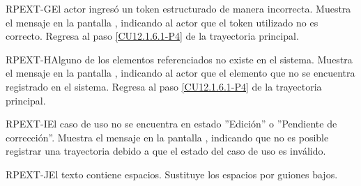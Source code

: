 	\begin{UCtrayectoriaA}{RPEXT-G}{El actor ingresó un token estructurado de manera incorrecta.}
		\UCpaso[\UCsist] Muestra el mensaje  en la pantalla , indicando al actor que el token utilizado no es correcto.
		\UCpaso Regresa al paso \ref{CU12.1.6.1-P4} de la trayectoria principal.
	\end{UCtrayectoriaA}
	
	\begin{UCtrayectoriaA}{RPEXT-H}{Alguno de los elementos referenciados no existe en el sistema.}
		\UCpaso[\UCsist] Muestra el mensaje  en la pantalla , indicando al actor que el elemento que no se encuentra registrado en el sistema.
		\UCpaso Regresa al paso \ref{CU12.1.6.1-P4} de la trayectoria principal.
	\end{UCtrayectoriaA}

	\begin{UCtrayectoriaA}{RPEXT-I}{El caso de uso no se encuentra en estado ''Edición'' o ''Pendiente de corrección''.}
		\UCpaso[\UCsist] Muestra el mensaje  en la pantalla , indicando que no es posible registrar una trayectoria debido a que el estado del caso de uso es inválido.
	\end{UCtrayectoriaA}

	\begin{UCtrayectoriaA}{RPEXT-J}{El texto contiene espacios.}
		\UCpaso[\UCsist] Sustituye los espacios por guiones bajos.
	\end{UCtrayectoriaA}
